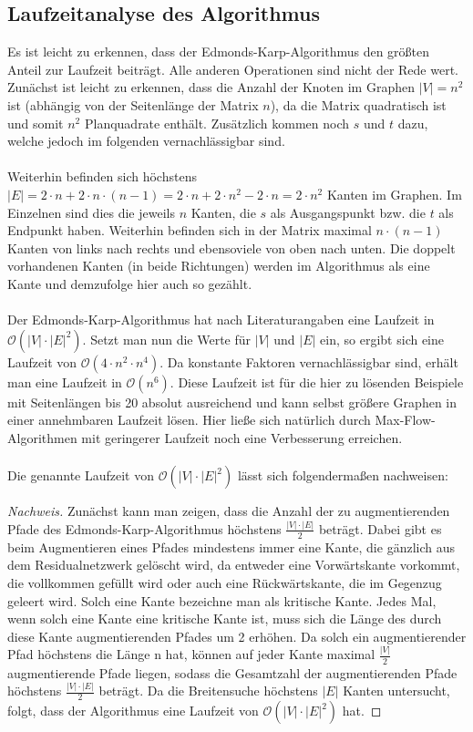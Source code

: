 \documentclass[a4paper, notitlepage, 12pt]{scrartcl}
\begin{document}
 \subsection{Laufzeitanalyse des Algorithmus}
Es ist leicht zu erkennen, dass der Edmonds-Karp-Algorithmus den größten Anteil zur Laufzeit beiträgt. Alle anderen Operationen sind nicht der Rede wert. Zunächst ist leicht zu erkennen, dass die Anzahl der Knoten im Graphen $|V| = n^{2}$ ist (abhängig von der Seitenlänge der Matrix $n$), da die Matrix quadratisch ist und somit $n^{2}$ Planquadrate enthält. Zusätzlich kommen noch $s$ und $t$ dazu, welche jedoch im folgenden vernachlässigbar sind. \\ \\
Weiterhin befinden sich höchstens $|E| = 2 \cdot n + 2 \cdot n \cdot (n-1) = 2 \cdot n + 2 \cdot n^{2} - 2 \cdot n = 2 \cdot n^{2} $ Kanten im Graphen. Im Einzelnen sind dies die jeweils $n$ Kanten, die $s$ als Ausgangspunkt bzw. die $t$ als Endpunkt haben. Weiterhin befinden sich in der Matrix maximal $n \cdot (n-1)$ Kanten von links nach rechts und ebensoviele von oben nach unten. Die doppelt vorhandenen Kanten (in beide Richtungen) werden im Algorithmus als eine Kante und demzufolge hier auch so gezählt. \\ \\
Der Edmonds-Karp-Algorithmus hat nach Literaturangaben eine Laufzeit in $\mathcal{O}(|V| \cdot |E|^{2})$. Setzt man nun die Werte für $|V|$ und $|E|$ ein, so ergibt sich eine Laufzeit von $\mathcal{O}(4 \cdot n^2 \cdot n^4)$. Da konstante Faktoren vernachlässigbar sind, erhält man eine Laufzeit in $\mathcal{O}(n^6)$. Diese Laufzeit ist für die hier zu lösenden Beispiele mit Seitenlängen bis 20 absolut ausreichend und kann selbst größere Graphen in einer annehmbaren Laufzeit lösen. Hier ließe sich natürlich durch Max-Flow-Algorithmen mit geringerer Laufzeit noch eine Verbesserung erreichen. \\ \\
Die genannte Laufzeit von $\mathcal{O}(|V| \cdot |E|^{2})$ lässt sich folgendermaßen nachweisen: 
\begin{proof}[Nachweis]
Zunächst kann man zeigen, dass die Anzahl der zu augmentierenden Pfade des Edmonds-Karp-Algorithmus höchstens $\frac{|V| \cdot |E|}{2}$ beträgt. Dabei gibt es beim Augmentieren eines Pfades mindestens immer eine Kante, die gänzlich aus dem Residualnetzwerk gelöscht wird, da entweder eine Vorwärtskante vorkommt, die vollkommen gefüllt wird oder auch eine Rückwärtskante, die im Gegenzug geleert wird. Solch eine Kante bezeichne man als kritische Kante. Jedes Mal, wenn solch eine Kante eine kritische Kante ist, muss sich die Länge des durch diese Kante augmentierenden Pfades um 2 erhöhen. Da solch ein augmentierender Pfad höchstens die Länge n hat, können auf jeder Kante maximal $\frac{|V|}{2}$ augmentierende Pfade liegen, sodass die Gesamtzahl der augmentierenden Pfade höchstens $\frac{|V| \cdot |E|}{2}$ beträgt. Da die Breitensuche höchstens $|E|$ Kanten untersucht, folgt, dass der Algorithmus eine Laufzeit von $\mathcal{O}(|V| \cdot |E|^{2})$ hat.
\end{proof}
\end{document}
